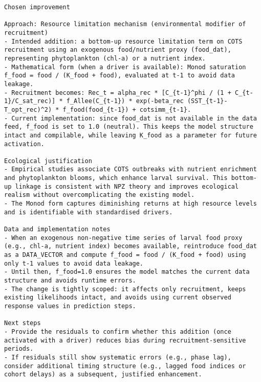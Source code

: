 \begin{lstlisting}
Chosen improvement

Approach: Resource limitation mechanism (environmental modifier of recruitment)
- Intended addition: a bottom-up resource limitation term on COTS recruitment using an exogenous food/nutrient proxy (food_dat), representing phytoplankton (chl-a) or a nutrient index.
- Mathematical form (when a driver is available): Monod saturation f_food = food / (K_food + food), evaluated at t-1 to avoid data leakage.
- Recruitment becomes: Rec_t = alpha_rec * [C_{t-1}^phi / (1 + C_{t-1}/C_sat_rec)] * f_Allee(C_{t-1}) * exp(-beta_rec (SST_{t-1}-T_opt_rec)^2) * f_food(food_{t-1}) + cotsimm_{t-1}.
- Current implementation: since food_dat is not available in the data feed, f_food is set to 1.0 (neutral). This keeps the model structure intact and compilable, while leaving K_food as a parameter for future activation.

Ecological justification
- Empirical studies associate COTS outbreaks with nutrient enrichment and phytoplankton blooms, which enhance larval survival. This bottom-up linkage is consistent with NPZ theory and improves ecological realism without overcomplicating the existing model.
- The Monod form captures diminishing returns at high resource levels and is identifiable with standardised drivers.

Data and implementation notes
- When an exogenous non-negative time series of larval food proxy (e.g., chl-a, nutrient index) becomes available, reintroduce food_dat as a DATA_VECTOR and compute f_food = food / (K_food + food) using only t-1 values to avoid data leakage.
- Until then, f_food=1.0 ensures the model matches the current data structure and avoids runtime errors.
- The change is tightly scoped: it affects only recruitment, keeps existing likelihoods intact, and avoids using current observed response values in prediction steps.

Next steps
- Provide the residuals to confirm whether this addition (once activated with a driver) reduces bias during recruitment-sensitive periods.
- If residuals still show systematic errors (e.g., phase lag), consider additional timing structure (e.g., lagged food indices or cohort delays) as a subsequent, justified enhancement.
\end{lstlisting}

